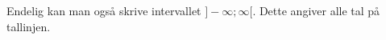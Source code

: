\documentclass[12pt,oneside,a4paper]{article}
\begin{document}
Endelig kan man også skrive intervallet $]-\infty ;\infty [$. Dette angiver
alle tal på tallinjen.

%
%
%
%
%
%
%
%
%
%
\end{document}
